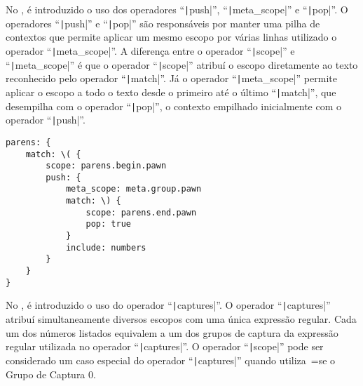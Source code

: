 No ,
é introduzido o uso dos operadores ``\texttt|push|'',
``\texttt|meta_scope|'' e
``\texttt|pop|''.
O operadores ``\texttt|push|'' e
``\texttt|pop|'' são responsáveis por manter uma pilha de contextos que permite aplicar um mesmo escopo por várias linhas utilizado o operador ``\texttt|meta_scope|''.
A diferença entre o operador ``\texttt|scope|'' e
``\texttt|meta_scope|'' é que o operador ``\texttt|scope|'' atribuí o escopo diretamente ao texto reconhecido pelo operador ``\texttt|match|''.
Já o operador ``\texttt|meta_scope|'' permite aplicar o escopo a todo o texto desde o primeiro até o último ``\texttt|match|'',
que desempilha com o operador ``\texttt|pop|'',
o contexto empilhado inicialmente com o operador ``\texttt|push|''.
\begin{lstlisting}[caption={Exemplo de Gramática, Contextos},label={code:exemploDeGramaticaPawn2},style=yaml_style]
parens: {
    match: \( {
        scope: parens.begin.pawn
        push: {
            meta_scope: meta.group.pawn
            match: \) {
                scope: parens.end.pawn
                pop: true
            }
            include: numbers
        }
    }
}
\end{lstlisting}

No ,
é introduzido o uso do operador ``\texttt|captures|''.
O operador ``\texttt|captures|'' atribuí simultaneamente diversos escopos com uma única expressão regular.
Cada um dos números listados equivalem a um dos grupos de captura da expressão regular utilizada no operador ``\texttt|captures|''.
O operador ``\texttt|scope|'' pode ser considerado um caso especial do operador ``\texttt|captures|'' quando utiliza~=se o Grupo de Captura 0.

